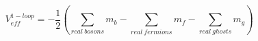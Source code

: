 \begin{equation}\label{Vformula}
V_{eff}^{1-loop}=-\frac{1}{2}\left(\sum_{real\ bosons}m_b-\sum_{real\
fermions}m_f-\sum_{real\ ghosts} m_g \right)
\end{equation}

